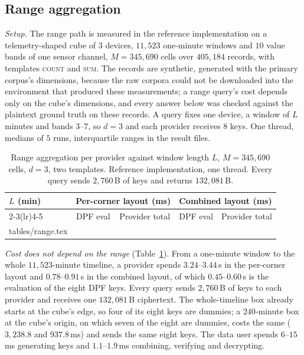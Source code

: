 \documentclass[a4paper,fleqn]{cas-sc}
\begin{document}
\subsection{Range aggregation}
\label{sec:rangeresult}
\emph{Setup.} The range path is measured in the reference implementation on a
telemetry-shaped cube of $3$ devices, $11{,}523$ one-minute windows and $10$
value bands of one sensor channel, $M=345{,}690$ cells over $405{,}184$
records, with templates \textsc{count} and \textsc{sum}. The records are
synthetic, generated with the primary corpus's dimensions, because the raw
corpora could not be downloaded into the environment that produced these
measurements; a range query's cost depends only on the cube's dimensions, and
every answer below was checked against the plaintext ground truth on these
records. A query fixes one device, a window of $L$ minutes and bands $3$--$7$,
so $d=3$ and each provider receives $8$ keys. One thread, medians of $5$
runs, interquartile ranges in the result files.

\begin{table}[pos=htbp]
\caption{Range aggregation per provider against window length $L$, $M=345{,}690$
cells, $d=3$, two templates. Reference implementation, one thread. Every query
sends $2{,}760$\,B of keys and returns $132{,}081$\,B.}
\label{tab:range}
\centering
\footnotesize
\begin{tabular*}{\tblwidth}{@{\extracolsep{\fill}}lcccc@{}}
\toprule
$L$ (min) & \multicolumn{2}{c}{Per-corner layout (ms)} & \multicolumn{2}{c}{Combined layout (ms)} \\
\cmidrule(lr){2-3}\cmidrule(lr){4-5}
 & DPF eval & Provider total & DPF eval & Provider total \\
\midrule
{} tables/range.tex 
\bottomrule
\end{tabular*}
\end{table}

\emph{Cost does not depend on the range} (Table~\ref{tab:range}). From a
one-minute window to the whole $11{,}523$-minute timeline, a provider spends
$3.24$--$3.44$\,s in the per-corner layout and $0.78$--$0.91$\,s in the
combined layout, of which $0.45$--$0.60$\,s is the evaluation of the eight DPF
keys. Every query sends $2{,}760$\,B of keys to each provider and receives one
$132{,}081$\,B ciphertext. The whole-timeline box already starts at the cube's
edge, so four of its eight keys are dummies; a $240$-minute box at the cube's
origin, on which seven of the eight are dummies, costs the same ($3{,}238.8$ and
$937.8$\,ms) and sends the same eight keys. The data user spends $6$--$15$\,ms generating keys and
$1.1$--$1.9$\,ms combining, verifying and decrypting.
\end{document}
